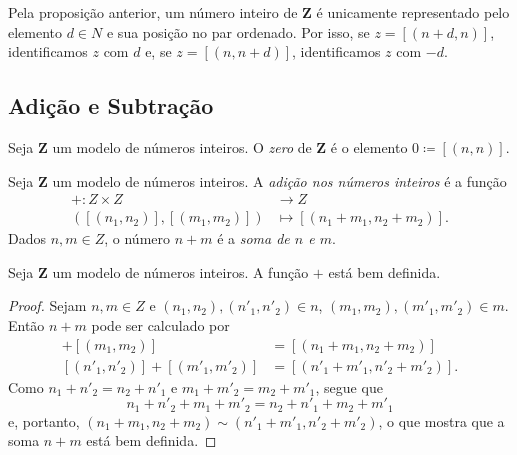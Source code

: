 	Pela proposição anterior, um número inteiro de $\bm Z$ é unicamente representado pelo elemento $d \in N$ e sua posição no par ordenado. Por isso, se $z=[(n+d,n)]$, identificamos $z$ com $d$ e, se $z=[(n,n+d)]$, identificamos $z$ com $-d$.


\subsection{Adição e Subtração}

\begin{defi}
	Seja $\bm Z$ um modelo de números inteiros. O \emph{zero} de $\bm Z$ é o elemento $0 \coloneqq [(n,n)]$.
\end{defi}

\begin{defi}
	Seja $\bm Z$ um modelo de números inteiros. A \emph{adição nos números inteiros} é a função
	\begin{align*}
	+: Z \times Z &\to Z \\
		([(n_1,n_2)],[(m_1,m_2)]) &\mapsto [(n_1+m_1,n_2+m_2)].
	\end{align*}
Dados $n,m \in Z$, o número $n+m$ é a \emph{soma de $n$ e $m$}.
\end{defi}

\begin{teo}
	Seja $\bm Z$ um modelo de números inteiros. A função $+$ está bem definida.
\end{teo}
\begin{proof}
	Sejam $n,m \in Z$ e $(n_1,n_2),(n'_1,n'_2) \in n$, $(m_1,m_2),(m'_1,m'_2) \in m$. Então $n+m$ pode ser calculado por
	\begin{align*}
	[(n_1,n_2)]+[(m_1,m_2)] &= [(n_1+m_1,n_2+m_2)] \\
	[(n'_1,n'_2)]+[(m'_1,m'_2)] &= [(n'_1+m'_1,n'_2+m'_2)].
	\end{align*}
Como $n_1+n'_2=n_2+n'_1$ e $m_1+m'_2=m_2+m'_1$, segue que
	\begin{equation*}
	n_1+n'_2+m_1+m'_2=n_2+n'_1+m_2+m'_1
	\end{equation*}
e, portanto, $(n_1+m_1,n_2+m_2) \sim (n'_1+m'_1,n'_2+m'_2)$, o que mostra que a soma $n+m$ está bem definida.
\end{proof}


